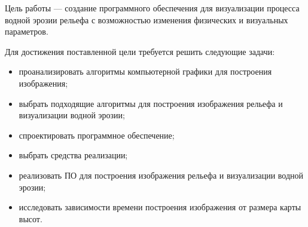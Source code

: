 
Цель работы --- создание программного обеспечения для визуализации процесса водной эрозии рельефа с возможностью изменения
физических и визуальных параметров.

Для достижения поставленной цели требуется решить следующие задачи:
\begin{itemize}
    \item проанализировать алгоритмы компьютерной графики для построения изображения;
    \item выбрать подходящие алгоритмы для построения изображения рельефа и визуализации водной эрозии;
    \item спроектировать программное обеспечение;
    \item выбрать средства реализации;
    \item реализовать ПО для построения изображения рельефа и визуализации водной эрозии;
    \item исследовать зависимости времени построения изображения от размера карты высот.
\end{itemize}